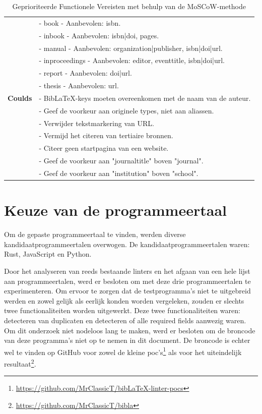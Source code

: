 \begin{table}[ht]
\begin{tabular}{p{2.5cm} p{13cm}}
        & - book - Aanbevolen: isbn. \\
        & - inbook - Aanbevolen: isbn|doi, pages. \\
        & - manual - Aanbevolen: organization|publisher, isbn|doi|url. \\
        & - inproceedings - Aanbevolen: editor, eventtitle, isbn|doi|url. \\
        & - report - Aanbevolen: doi|url. \\
        & - thesis - Aanbevolen: url. \\
        \midrule
        \textbf{Coulds} & 
          - BibLaTeX-keys moeten overeenkomen met de naam van de auteur. \\
        & - Geef de voorkeur aan originele types, niet aan aliassen. \\
        & - Verwijder tekstmarkering van URL. \\
        & - Vermijd het citeren van tertiaire bronnen. \\
        & - Citeer geen startpagina van een website. \\
        & - Geef de voorkeur aan "journaltitle" boven "journal". \\
        & - Geef de voorkeur aan "institution" boven "school". \\
        \bottomrule
    \end{tabular}
    \caption{Geprioriteerde Functionele Vereisten met behulp van de MoSCoW-methode}
    \label{tab:functional_requirements}
    \end{table}


\section{Keuze van de programmeertaal}
Om de gepaste programmeertaal te vinden, werden diverse kandidaatprogrammeertalen overwogen. De kandidaatprogrammeertalen waren: Rust, JavaScript en Python.

Door het analyseren van reeds bestaande linters en het afgaan van een hele lijst aan programmeertalen, werd er besloten om met deze drie programmeertalen te experimenteren. Om ervoor te zorgen dat de testprogramma's niet te uitgebreid werden en zowel gelijk als eerlijk konden worden vergeleken, zouden er slechts twee functionaliteiten worden uitgewerkt. Deze twee functionaliteiten waren: detecteren van duplicaten en detecteren of alle required fields aanwezig waren. Om dit onderzoek niet nodeloos lang te maken, werd er besloten om de broncode van deze programma's niet op te nemen in dit document. De broncode is echter wel te vinden op GitHub voor zowel de kleine poc's\footnote{\url{https://github.com/MrClassicT/bibLaTeX-linter-pocs}} als voor het uiteindelijk resultaat\footnote{\url{https://github.com/MrClassicT/bibla}}.


